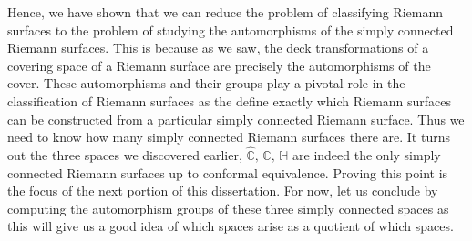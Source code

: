 \documentclass[11pt]{report}
\theoremstyle{definition}
\begin{document}
Hence, we have shown that we can reduce the problem of classifying Riemann surfaces to the problem of studying the automorphisms of the simply connected Riemann surfaces. This is because as we saw, the deck transformations of a covering space of a Riemann surface are precisely the automorphisms of the cover. These automorphisms and their groups play a pivotal role in the classification of Riemann surfaces as the define exactly which Riemann surfaces can be constructed from a particular simply connected Riemann surface. Thus we need to know how many simply connected Riemann surfaces there are. It turns out the three spaces we discovered earlier, $\widehat{\mathbb{C}},\, \mathbb{C},\,\mathbb{H}$ are indeed the only simply connected Riemann surfaces up to conformal equivalence. Proving this point is the focus of the next portion of this dissertation. For now, let us conclude by computing the automorphism groups of these three simply connected spaces as this will give us a good idea of which spaces arise as a quotient of which spaces.
\end{document}
